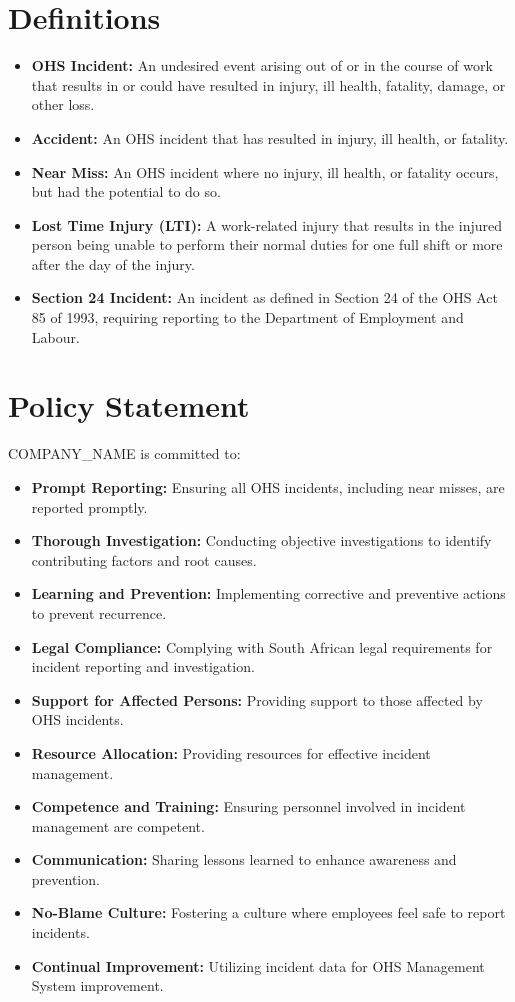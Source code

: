 \documentclass[12pt]{article}
\begin{document}
\section{Definitions}
\begin{itemize}
    \item \textbf{OHS Incident:} An undesired event arising out of or in the course of work that results in or could have resulted in injury, ill health, fatality, damage, or other loss.
    \item \textbf{Accident:} An OHS incident that has resulted in injury, ill health, or fatality.
    \item \textbf{Near Miss:} An OHS incident where no injury, ill health, or fatality occurs, but had the potential to do so.
    \item \textbf{Lost Time Injury (LTI):} A work-related injury that results in the injured person being unable to perform their normal duties for one full shift or more after the day of the injury.
    \item \textbf{Section 24 Incident:} An incident as defined in Section 24 of the OHS Act 85 of 1993, requiring reporting to the Department of Employment and Labour.
\end{itemize}

\section{Policy Statement}
{{COMPANY_NAME}} is committed to:
\begin{itemize}
    \item \textbf{Prompt Reporting:} Ensuring all OHS incidents, including near misses, are reported promptly.
    \item \textbf{Thorough Investigation:} Conducting objective investigations to identify contributing factors and root causes.
    \item \textbf{Learning and Prevention:} Implementing corrective and preventive actions to prevent recurrence.
    \item \textbf{Legal Compliance:} Complying with South African legal requirements for incident reporting and investigation.
    \item \textbf{Support for Affected Persons:} Providing support to those affected by OHS incidents.
    \item \textbf{Resource Allocation:} Providing resources for effective incident management.
    \item \textbf{Competence and Training:} Ensuring personnel involved in incident management are competent.
    \item \textbf{Communication:} Sharing lessons learned to enhance awareness and prevention.
    \item \textbf{No-Blame Culture:} Fostering a culture where employees feel safe to report incidents.
    \item \textbf{Continual Improvement:} Utilizing incident data for OHS Management System improvement.
\end{itemize}
\end{document}
